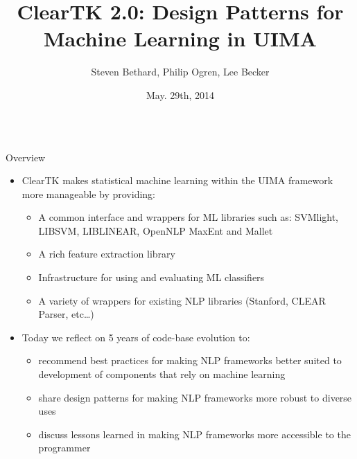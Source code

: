 \documentclass[final]{beamer}
\title{\Huge ClearTK 2.0: Design Patterns for Machine Learning in UIMA\\[0.2ex]}
\author{Steven Bethard\inst{1}, Philip Ogren\inst{2}, Lee Becker\inst{2}}
\institute[] %
{
  \inst{1}%
  University of Alabama at Birmingham, Birmingham, AL, USA
  \\
  \inst{2}%
  University of Colorado Boulder, Boulder, CO, USA
}
\date[May. 29th, 2014]{May. 29th, 2014}
\begin{document}
\begin{frame}{} 
\vspace{-1cm}
\begin{columns}[t]
  \begin{column}{.45\linewidth}
    
    \begin{block}{Overview}
      \begin{itemize}
      \item ClearTK makes statistical machine learning within the UIMA framework more manageable by providing:

        \begin{itemize}
        \item A common interface and wrappers for ML libraries such as: SVMlight, LIBSVM, LIBLINEAR, OpenNLP MaxEnt and Mallet
        \item A rich feature extraction library
        \item Infrastructure for using and evaluating ML classifiers
        \item A variety of wrappers for existing NLP libraries (Stanford, CLEAR Parser, etc\ldots)
        \end{itemize}

      \item Today we reflect on 5 years of code-base evolution to:
        \begin{itemize}
        \item recommend best practices for making NLP frameworks better suited to development of components that rely on machine learning 
        \item share design patterns for making NLP frameworks more robust to diverse uses
        \item discuss lessons learned in making NLP frameworks more accessible to the programmer
        \end{itemize}
      \end{itemize}
    \end{block}
    

\end{column}
\end{columns}
\end{frame}
\end{document}
